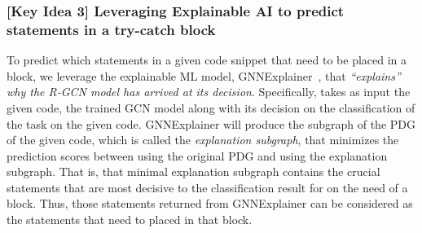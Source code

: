 


\subsubsection{{\bf [Key Idea 3] Leveraging Explainable AI to predict statements in a try-catch block}} To predict which statements in a given code snippet that need to be
placed in a  block, we leverage the explainable ML
model, GNNExplainer~\cite{GNNExplainer}, that {\em ``explains'' why
  the R-GCN model has arrived at its decision}. Specifically, {\tool}
takes as input the given code, the trained GCN model along with its
decision on the classification of the task {\xblock} on the given
code. GNNExplainer will produce the subgraph of the PDG of the given
code, which is called the {\em explanation subgraph}, that minimizes
the prediction scores between using the original PDG and using the
explanation subgraph. That is, that minimal explanation subgraph
contains the crucial statements that are most decisive to the
classification result for {\xblock} on the need of a 
block.  Thus, those statements returned from GNNExplainer can be
considered as the statements that need to placed in that
block.
